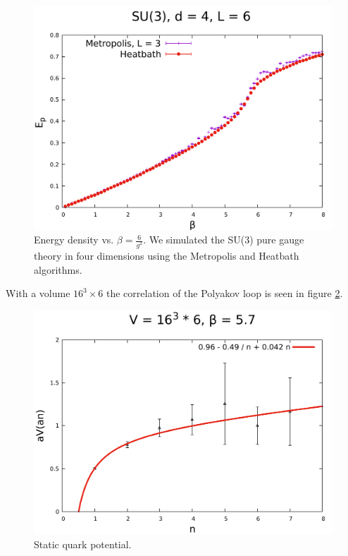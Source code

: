 \documentclass[12pt,a4paper]{article}
\begin{document}
\begin{center}
\begin{figure}
\includegraphics[scale=0.6]{../images/L=6_heatbath_L=3_metropolis.pdf}
\caption{Energy density vs. $\beta = \frac{6}{g^2}$. We simulated the SU(3) pure gauge theory in four dimensions using the Metropolis and Heatbath algorithms.}
\label{fig:Ep}
\end{figure}
\end{center}

With a volume $16^3 \times 6$ the correlation of the Polyakov loop is seen in figure \ref{fig:correlation_polyakov}.

\begin{figure}
\includegraphics[scale=0.6]{../images/correlation_polyakov.pdf}
\caption{Static quark potential.}
\label{fig:correlation_polyakov}
\end{figure}
\end{document}
